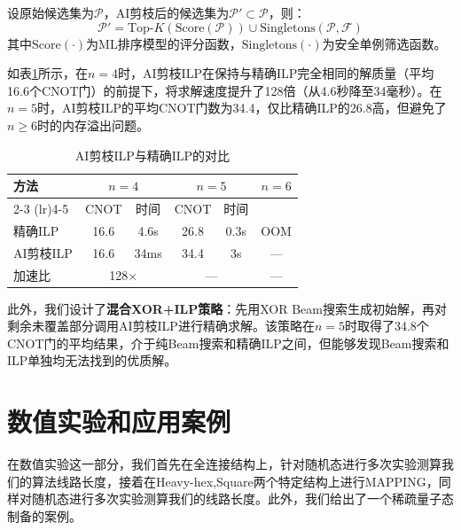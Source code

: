 \documentclass[10.5pt,compsoc,UTF8]{CjC}
\newcommand{\heiti}{\CJKfamily{STHeiti}}
\theoremstyle{mystyle}
\begin{document}
设原始候选集为$\mathcal{P}$，AI剪枝后的候选集为$\mathcal{P}' \subset \mathcal{P}$，则：
\begin{equation}
  \mathcal{P}' = \mathrm{Top\text{-}}K(\mathrm{Score}(\mathcal{P})) \cup \mathrm{Singletons}(\mathcal{P}, \mathcal{F})
\end{equation}
其中$\mathrm{Score}(\cdot)$为ML排序模型的评分函数，$\mathrm{Singletons}(\cdot)$为安全单例筛选函数。

如表\ref{tab:ai-ilp}所示，在$n=4$时，AI剪枝ILP在保持与精确ILP完全相同的解质量（平均16.6个CNOT门）的前提下，将求解速度提升了128倍（从4.6秒降至34毫秒）。在$n=5$时，AI剪枝ILP的平均CNOT门数为34.4，仅比精确ILP的26.8高，但避免了$n \ge 6$时的内存溢出问题。

\begin{table}[H]
  \centering
  \caption{AI剪枝ILP与精确ILP的对比}
  \label{tab:ai-ilp}
  \setlength{\tabcolsep}{6pt}
  \begin{tabular}{lccccc}
    \toprule
    \multirow{2}{*}{方法} & \multicolumn{2}{c}{$n{=}4$} & \multicolumn{2}{c}{$n{=}5$} & \multirow{2}{*}{$n{=}6$} \\
    \cmidrule(lr){2-3} \cmidrule(lr){4-5}
    & CNOT & 时间 & CNOT & 时间 & \\
    \midrule
    精确ILP & 16.6 & 4.6s & 26.8 & 0.3s & OOM \\
    AI剪枝ILP & 16.6 & 34ms & 34.4 & 3s & --- \\
    \midrule
    加速比 & \multicolumn{2}{c}{128$\times$} & \multicolumn{2}{c}{---} & --- \\
    \bottomrule
  \end{tabular}
\end{table}

此外，我们设计了\textbf{混合XOR+ILP策略}：先用XOR Beam搜索生成初始解，再对剩余未覆盖部分调用AI剪枝ILP进行精确求解。该策略在$n=5$时取得了34.8个CNOT门的平均结果，介于纯Beam搜索和精确ILP之间，但能够发现Beam搜索和ILP单独均无法找到的优质解。




\section{\heiti 数值实验和应用案例}

在数值实验这一部分，我们首先在全连接结构上，针对随机态进行多次实验测算我们的算法线路长度，接着在Heavy-hex,Square两个特定结构上进行MAPPING，同样对随机态进行多次实验测算我们的线路长度。此外，我们给出了一个稀疏量子态制备的案例。
\end{document}
